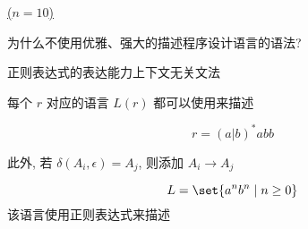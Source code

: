 \begin{frame}{}
  \begin{center}
    \href{https://en.wikipedia.org/wiki/Dragon\_curve}{ ($n = 10$)}
  \end{center}
\end{frame}

\begin{frame}{}
  \begin{center}
    为什么不使用优雅、强大的描述程序设计语言的语法?

    \vspace{0.50cm}
    正则表达式的表达能力上下文无关文法
  \end{center}
\end{frame}

\begin{frame}{}
  \begin{center}
    每个 $r$ 对应的语言 $L(r)$ 都可以使用来描述

    \[
      r = (a | b)^{\ast} abb
    \]

    \pause

    \pause
    此外, 若 $\delta(A_i, \epsilon) = A_{j}$, 则添加 $A_{i} \to A_{j}$
  \end{center}
\end{frame}

\begin{frame}{}
  \begin{center}
    

    \[
      L = \set{a^{n} b^{n} \mid n \ge 0}
    \]
    该语言使用正则表达式来描述
  \end{center}
\end{frame}

